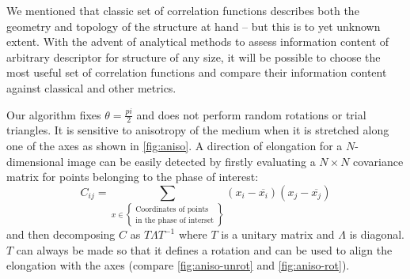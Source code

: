 \documentclass[reprint,amsmath,amssymb,aps,pre,showkeys,showpacs]{revtex4-1}
\begin{document}
We mentioned that classic set of correlation functions describes
both the geometry and topology of the structure at hand -- but this is to yet
unknown extent. With the advent of analytical methods
\cite{cherkasov2023towards} to assess information content of arbitrary
descriptor for structure of any size, it will be possible to choose the most
useful set of correlation functions and compare their information content
against classical and other metrics.

Our algorithm fixes $\theta = \frac{pi}{2}$ and does not perform random
rotations or trial triangles. It is sensitive to anisotropy of the medium
when it is stretched along one of the axes as shown in \cref{fig:aniso}. A
direction of elongation for a $N$-dimensional image can be easily detected by
firstly evaluating a $N \times N$ covariance matrix for points belonging to the
phase of interest:
\begin{equation}
  C_{ij} = \sum_{x \in \left\{
    \begin{array}{l}
      \text{Coordinates of points} \\
      \text{in the phase of interset}
    \end{array}
    \right\}} (x_i - \overline{x_i})(x_j - \overline{x_j})
\end{equation}
and then decomposing $C$ as $T \Lambda T^{-1}$ where $T$ is a unitary matrix and
$\Lambda$ is diagonal. $T$ can always be made so that it defines a rotation and
can be used to align the elongation with the axes (compare \cref{fig:aniso-unrot}
and \cref{fig:aniso-rot}).
\end{document}
